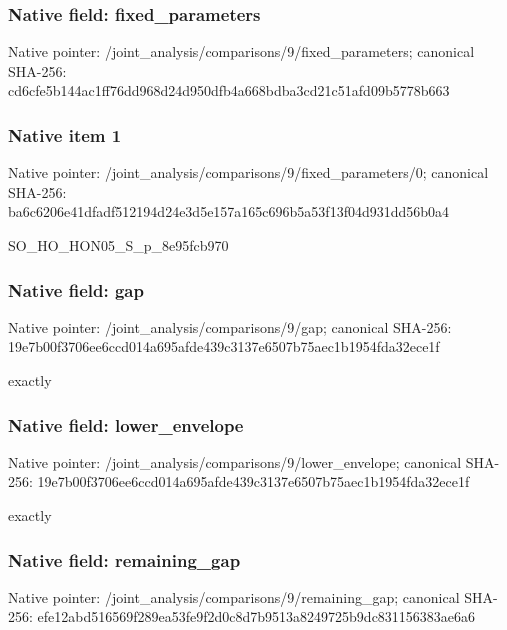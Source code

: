 \documentclass[10pt,a4paper]{article}
\begin{document}
\subsubsection{Native field: fixed\_\allowbreak{}parameters}
Native pointer: /joint\_\allowbreak{}analysis/comparisons/9/fixed\_\allowbreak{}parameters; canonical SHA-256: cd6cfe5b144ac1ff76dd968d24d950dfb4a668bdba3cd21c51afd09b5778b663

\subsubsection{Native item 1}
Native pointer: /joint\_\allowbreak{}analysis/comparisons/9/fixed\_\allowbreak{}parameters/0; canonical SHA-256: ba6c6206e41dfadf512194d24e3d5e157a165c696b5a53f13f04d931dd56b0a4

\begingroup\raggedright\sloppy SO\_\allowbreak{}HO\_\allowbreak{}HON05\_\allowbreak{}S\_\allowbreak{}p\_\allowbreak{}8e95fcb970\par\endgroup

\subsubsection{Native field: gap}
Native pointer: /joint\_\allowbreak{}analysis/comparisons/9/gap; canonical SHA-256: 19e7b00f3706ee6ccd014a695afde439c3137e6507b75aec1b1954fda32ece1f

\begingroup\raggedright{} exactly\par\endgroup

\subsubsection{Native field: lower\_\allowbreak{}envelope}
Native pointer: /joint\_\allowbreak{}analysis/comparisons/9/lower\_\allowbreak{}envelope; canonical SHA-256: 19e7b00f3706ee6ccd014a695afde439c3137e6507b75aec1b1954fda32ece1f

\begingroup\raggedright{} exactly\par\endgroup

\subsubsection{Native field: remaining\_\allowbreak{}gap}
Native pointer: /joint\_\allowbreak{}analysis/comparisons/9/remaining\_\allowbreak{}gap; canonical SHA-256: efe12abd516569f289ea53fe9f2d0c8d7b9513a8249725b9dc831156383ae6a6
\end{document}
